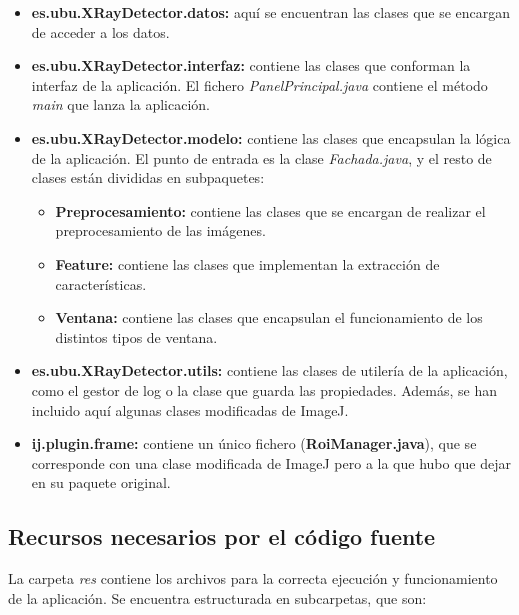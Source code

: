 \begin{itemize}
\item \textbf{es.ubu.XRayDetector.datos:} aquí se encuentran las clases que se encargan de acceder a los datos.
\item \textbf{es.ubu.XRayDetector.interfaz:} contiene las clases que conforman la interfaz de la aplicación. El fichero \textit{PanelPrincipal.java} contiene el método \textit{main} que lanza la aplicación.
\item \textbf{es.ubu.XRayDetector.modelo:} contiene las clases que encapsulan la lógica de la aplicación. El punto de entrada es la clase \textit{Fachada.java}, y el resto de clases están divididas en subpaquetes:
	\begin{itemize}
		\item \textbf{Preprocesamiento:} contiene las clases que se encargan de realizar el preprocesamiento de las imágenes.
		\item \textbf{Feature:} contiene las clases que implementan la extracción de características.
		\item \textbf{Ventana:} contiene las clases que encapsulan el funcionamiento de los distintos tipos de ventana.
	\end{itemize}
\item \textbf{es.ubu.XRayDetector.utils:} contiene las clases de utilería de la aplicación, como el gestor de log o la clase que guarda las propiedades. Además, se han incluido aquí algunas clases modificadas de ImageJ.
\item \textbf{ij.plugin.frame:} contiene un único fichero (\textbf{RoiManager.java}), que se corresponde con una clase modificada de ImageJ pero a la que hubo que dejar en su paquete original.
\end{itemize}

\subsection{Recursos necesarios por el código fuente}
La carpeta \textit{res} contiene los archivos para la correcta ejecución y funcionamiento de la aplicación. Se encuentra estructurada en subcarpetas, que son:


